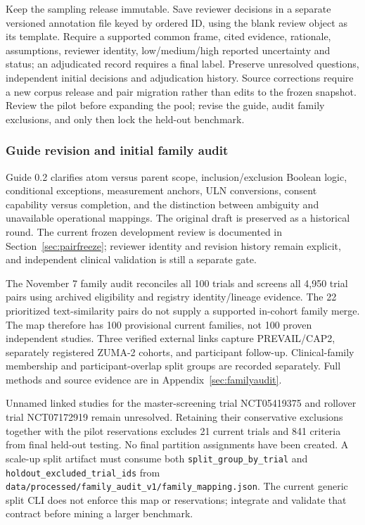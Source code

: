 \documentclass[10pt,letterpaper]{article}
\newcommand{\pathcode}[1]{\nolinkurl{#1}}
\begin{document}
Keep the sampling release immutable. Save reviewer decisions in a separate
versioned annotation file keyed by ordered ID, using the blank review object
as its template. Require a supported common frame, cited evidence, rationale,
assumptions, reviewer identity, low/medium/high reported uncertainty and status;
an adjudicated record requires a final label. Preserve unresolved questions,
independent initial decisions and adjudication history. Source corrections
require a new corpus release and pair migration rather than edits to the
frozen snapshot. Review the pilot before expanding the pool; revise the guide,
audit family exclusions, and only then lock the held-out benchmark.

\subsubsection{Guide revision and initial family audit}
Guide 0.2 clarifies atom versus parent scope, inclusion/exclusion Boolean
logic, conditional exceptions, measurement anchors, ULN conversions,
consent capability versus completion, and the distinction between ambiguity
and unavailable operational mappings. The original draft is preserved as a
historical round. The current frozen development review is documented in
Section~\ref{sec:pairfreeze}; reviewer identity and revision history remain
explicit, and independent clinical validation is still a separate gate.

The November 7 family audit reconciles all 100 trials and screens all 4,950
trial pairs using archived eligibility and registry identity/lineage evidence.
The 22 prioritized text-similarity pairs do not supply a supported in-cohort
family merge. The map therefore has 100 provisional current families, not
100 proven independent studies. Three verified external links capture
PREVAIL/CAP2, separately registered ZUMA-2 cohorts, and participant follow-up.
Clinical-family membership and participant-overlap split groups are recorded
separately. Full methods and source evidence are in
Appendix~\ref{sec:familyaudit}.

Unnamed linked studies for the master-screening trial NCT05419375 and
rollover trial NCT07172919 remain unresolved. Retaining their conservative
exclusions together with the pilot reservations excludes 21 current trials
and 841 criteria from final held-out testing. No final partition assignments
have been created. A scale-up split artifact must consume both
\pathcode{split_group_by_trial} and
\pathcode{holdout_excluded_trial_ids} from
\pathcode{data/processed/family_audit_v1/family_mapping.json}.
The current generic split CLI does not enforce this map or reservations;
integrate and validate that contract before mining a larger benchmark.
\end{document}

